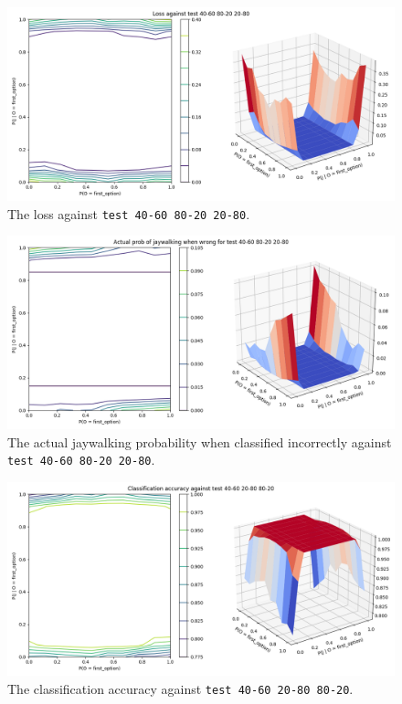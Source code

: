\documentclass{report}
\newcommand{\code}{\texttt}
\begin{document}
\begin{figure}[h]
    \centering
    \includegraphics[width=\textwidth]{test_40-60_80-20_20-80_loss.png}
    \caption[]{The loss against \code{test 40-60 80-20 20-80}.}
    \label{fig:test_40-60_80-20_20-80_loss_plot}
\end{figure}

\begin{figure}[h]
    \centering
    \includegraphics[width=\textwidth]{test_40-60_80-20_20-80_jay_prob.png}
    \caption[]{The actual jaywalking probability when classified incorrectly against \code{test 40-60 80-20 20-80}.}
    \label{fig:test_40-60_80-20_20-80_jay_prob_plot}
\end{figure}

% 
% 

\begin{figure}[h]
    \centering
    \includegraphics[width=\textwidth]{test_40-60_20-80_80-20_accuracy.png}
    \caption[]{The classification accuracy against \code{test 40-60 20-80 80-20}.}
    \label{fig:test_40-60_20-80_80-20_accuracy_plot}
\end{figure}
\end{document}

